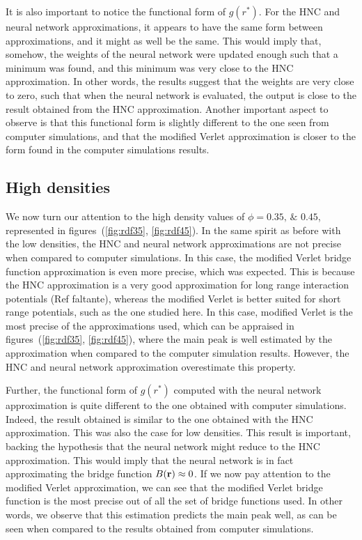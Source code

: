 It is also important to notice the functional form of $g(r^*)$. For the HNC and neural
network approximations, it appears to have the same form between approximations, and it 
might as well be the same. This would imply that, somehow, the weights of the neural network
were updated enough such that a minimum was found, and this minimum was very close to the
HNC approximation. In other words, the results suggest that the weights are very close to
zero, such that when the neural network is evaluated, the output is close to the
result obtained from the HNC approximation.
Another important aspect to observe is that this functional form is slightly different
to the one seen from computer simulations, and that the modified Verlet approximation is 
closer to the form found in the computer simulations results.

\subsection{High densities}
We now turn our attention to the high density values of
$\phi=\numlist[list-pair-separator={\enspace\text{and}\enspace}]{0.35; 0.45}$,
represented in figures~(\ref{fig:rdf35}, \ref{fig:rdf45}).
In the same spirit as before with the low densities, the HNC and neural network 
approximations are not precise when compared to computer simulations. In this case,
the modified Verlet bridge function approximation is even more precise, which was expected.
This is because the HNC approximation is a very good approximation for long range
interaction potentials (Ref faltante), whereas the modified Verlet is better suited for 
short range potentials, such as the one studied here.
In this case, modified Verlet is the most precise of the approximations used, which
can be appraised in figures~(\ref{fig:rdf35}, \ref{fig:rdf45}), where the 
main peak is well estimated by the approximation when compared to the computer simulation
results. However, the HNC and neural network approximation overestimate this property.

Further, the functional form of $g(r^*)$ computed with the neural network approximation 
is quite different to the one obtained with computer simulations. Indeed, the result
obtained is similar to the one obtained with the HNC approximation. This was also the
case for low densities. This result is important, backing the hypothesis that the
neural network might reduce to the HNC approximation.
This would imply that the neural network is in fact approximating the bridge function
$B(\mathbf{r}) \approx 0$. If we now pay attention to the modified Verlet
approximation, we can see that the modified Verlet bridge function is the most precise
out of all the set of bridge functions used. In other words, we observe that this
estimation predicts the main peak well, as can be seen when compared to the results
obtained from computer simulations.

